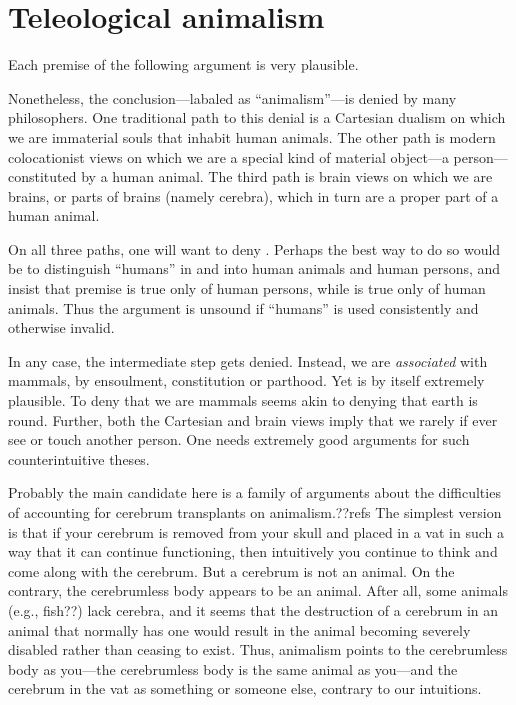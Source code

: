 \section{Teleological animalism}
Each premise of the following argument is very plausible.

Nonetheless, the conclusion---labaled as ``animalism''---is denied by many philosophers. One traditional path to 
this denial is a Cartesian dualism on which we are immaterial souls that inhabit human animals. The other path 
is modern colocationist views on which we are a special kind of material object---a person---constituted by a human 
animal. The third path is brain views on which we are brains, or parts of brains (namely cerebra), which in turn are a 
proper part of a human animal. 

On all three paths, one will want to deny . Perhaps the best way to do so would be to distinguish ``humans'' 
in  and  into  human animals and human persons, and insist that premise  is true 
only of human persons, while  is true only of human animals. Thus the argument is unsound if ``humans'' is used 
consistently and otherwise invalid. 

In any case, the intermediate step  gets denied. Instead, we are 
\textit{associated} with mammals, by ensoulment, constitution or parthood.   Yet  is by itself extremely plausible. 
To deny that we are mammals seems akin to denying that earth
is round. Further, both the Cartesian and brain views imply that we
rarely if ever see or touch another person. One needs extremely good arguments for such counterintuitive theses. 

Probably the main candidate here is a family of arguments about the difficulties of accounting for cerebrum transplants
on animalism.??refs The simplest version is that if your cerebrum is removed from your skull and placed in a vat in such a way
that it can continue functioning, then intuitively you continue to think and come along with the cerebrum. But a cerebrum
is not an animal. On the contrary, the cerebrumless body appears to be an animal. After all, some animals (e.g., fish??) lack
cerebra, and it seems that the destruction of a cerebrum in an animal that normally has one would result in the animal 
becoming severely disabled rather than ceasing to exist. Thus, animalism points to the cerebrumless body as you---the cerebrumless
body is the same animal as you---and the cerebrum in the vat as something  or someone else, contrary to our intuitions.

